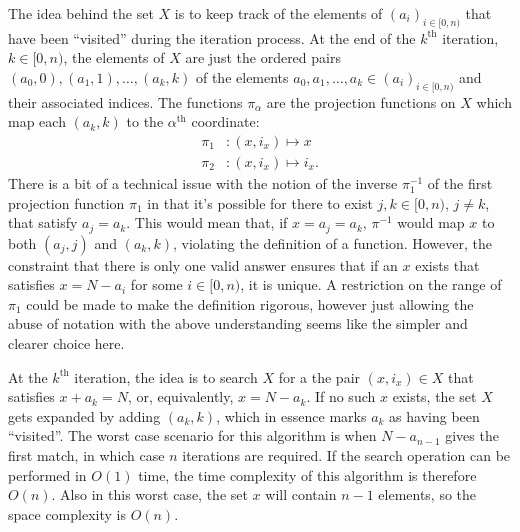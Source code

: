 The idea behind the set $X$ is to keep track of the elements of $(a_i)_{i \in [0, n)}$ that have been ``visited'' during the iteration process. At the end of the $k^{\text{th}}$ iteration, $k \in [0, n)$, the elements of $X$ are just the ordered pairs $(a_0, 0), (a_1, 1), \ldots, (a_k, k)$ of the elements $a_0, a_1, \ldots, a_k \in (a_i)_{i \in [0, n)}$ and their associated indices. The functions $\pi_{\alpha}$ are the projection functions on $X$ which map each $(a_k, k)$ to the $\alpha^{\text{th}}$ coordinate:
\begin{align*}
  \pi_1 &: (x, i_x) \mapsto x \\
  \pi_2 &: (x, i_x) \mapsto i_x.
\end{align*}
There is a bit of a technical issue with the notion of the inverse $\pi_1^{-1}$ of the first projection function $\pi_1$ in that it's possible for there to exist $j, k \in [0, n)$, $j \neq k$, that satisfy $a_j = a_k$. This would mean that, if $x = a_j = a_k$, $\pi^{-1}$ would map $x$ to both $(a_j, j)$ and $(a_k, k)$, violating the definition of a function. However, the constraint that there is only one valid answer ensures that if an $x$ exists that satisfies $x = N - a_i$ for some $i \in [0, n)$, it is unique. A restriction on the range of $\pi_1$ could be made to make the definition rigorous, however just allowing the abuse of notation with the above understanding seems like the simpler and clearer choice here.

At the $k^{\text{th}}$ iteration, the idea is to search $X$ for a the pair $(x, i_x) \in X$ that satisfies $x + a_k = N$, or, equivalently, $x = N - a_k$. If no such $x$ exists, the set $X$ gets expanded by adding $(a_k, k)$, which in essence marks $a_k$ as having been ``visited''. The worst case scenario for this algorithm is when $N - a_{n - 1}$ gives the first match, in which case $n$ iterations are required. If the search operation can be performed in $O(1)$ time, the time complexity of this algorithm is therefore $O(n)$. Also in this worst case, the set $x$ will contain $n - 1$ elements, so the space complexity is $O(n)$.


\clearpage
